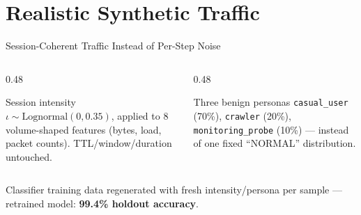 \documentclass[aspectratio=169, 12pt]{beamer}
\begin{document}
\section{Realistic Synthetic Traffic}

\begin{frame}{Session-Coherent Traffic Instead of Per-Step Noise}
  \begin{center}
  \end{center}
  \vspace{0.3cm}
  \begin{columns}[T]
    \begin{column}{0.48\textwidth}
      \begin{block}{Session intensity}
        $\iota \sim \text{Lognormal}(0, 0.35)$, applied to 8
        volume-shaped features (bytes, load, packet counts).
        TTL/window/duration untouched.
      \end{block}
    \end{column}
    \begin{column}{0.48\textwidth}
      \begin{block}{Three benign personas}
        \texttt{casual\_user} (70\%), \texttt{crawler} (20\%),
        \texttt{monitoring\_probe} (10\%) — instead of one fixed
        ``NORMAL'' distribution.
      \end{block}
    \end{column}
  \end{columns}
  \vspace{0.2cm}
  \begin{center}
    \textcolor{honeygrey}{\small Classifier training data regenerated with fresh
    intensity/persona per sample — retrained model: \textbf{99.4\% holdout accuracy}.}
  \end{center}
\end{frame}
\end{document}
